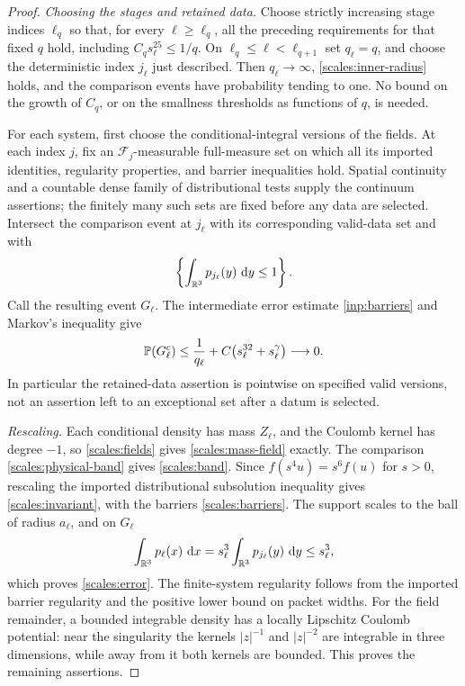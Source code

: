 \begin{proof}
\emph{Choosing the stages and retained data.}
Choose strictly increasing stage indices $\ell_q$ so that, for every
$\ell\ge\ell_q$, all the preceding requirements for that fixed $q$ hold,
including $C_qs_\ell^{25}\le1/q$.  On
$\ell_q\le\ell<\ell_{q+1}$ set $q_\ell=q$, and choose the deterministic
index $j_\ell$ just described.  Then $q_\ell\to\infty$,
\eqref{scales:inner-radius} holds, and the comparison events have
probability tending to one.  No bound on the growth of $C_q$, or on the
smallness thresholds as functions of $q$, is needed.

For each system, first choose the conditional-integral versions of the
fields.  At each index $j$, fix an $\mathcal F_j$-measurable full-measure
set on which all its imported identities, regularity properties, and
barrier inequalities hold.  Spatial continuity and a countable dense
family of distributional tests supply the continuum assertions; the
finitely many such sets are fixed before any data are selected.  Intersect
the comparison event at $j_\ell$ with its corresponding valid-data set
and with
\[
 \left\{\int_{\mathbb R^3}p_{j_\ell}(y)\,\,\mathrm d y\le1\right\}.
\]
Call the resulting event $G_\ell$.  The intermediate error estimate
\eqref{inp:barriers} and Markov's inequality give
\[
 \mathbb P(G_\ell^c)
 \le\frac1{q_\ell}+C\bigl(s_\ell^{32}+s_\ell^\gamma\bigr)
 \longrightarrow0.
\]
In particular the retained-data assertion is pointwise on specified valid
versions, not an assertion left to an exceptional set after a datum is
selected.

\emph{Rescaling.}
Each conditional density has mass
$Z_\ell$, and the Coulomb kernel has degree $-1$, so
\eqref{scales:fields} gives \eqref{scales:mass-field} exactly.
The comparison \eqref{scales:physical-band} gives
\eqref{scales:band}.  Since $f(s^4u)=s^6f(u)$ for $s>0$, rescaling the
imported distributional subsolution inequality gives
\eqref{scales:invariant}, with the barriers
\eqref{scales:barriers}.  The support scales to the ball of radius
$a_\ell$, and on $G_\ell$
\[
 \int_{\mathbb R^3}p_\ell(x)\,\,\mathrm d x
 =s_\ell^3\int_{\mathbb R^3}p_{j_\ell}(y)\,\,\mathrm d y\le s_\ell^3,
\]
which proves \eqref{scales:error}.  The finite-system regularity follows
from the imported barrier regularity and the positive lower bound on
packet widths.  For the field remainder, a bounded integrable density has
a locally Lipschitz Coulomb potential: near the singularity the kernels
$|z|^{-1}$ and $|z|^{-2}$ are integrable in three dimensions, while away
from it both kernels are bounded.  This proves the remaining assertions.
\end{proof}
